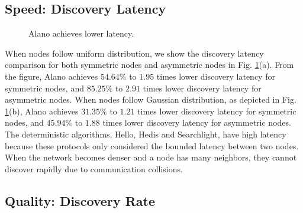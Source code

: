 \subsection{Speed: Discovery Latency}

\begin{figure}[!h]
\centering
{}
\hspace{0.01in}
\caption{Alano achieves lower latency.}
\label{fig_latency}
\end{figure}

When nodes follow uniform distribution, we show the discovery latency comparison for both symmetric nodes and asymmetric nodes in Fig. \ref{fig_latency}(a).
From the figure, Alano achieves $54.64\%$ to $1.95$ times lower discovery latency for symmetric nodes, and $85.25\%$ to $2.91$ times lower discovery latency for asymmetric nodes.
When nodes follow Gaussian distribution, as depicted in Fig. \ref{fig_latency}(b), 
Alano achieves $31.35\%$ to $1.21$ times lower discovery latency for symmetric nodes, and $45.94\%$ to $1.88$ times lower discovery latency for asymmetric nodes.
The deterministic algorithms, Hello, Hedis and Searchlight, have high latency because these protocols only considered the bounded latency between two nodes. When the network becomes denser and a node has many neighbors, they cannot discover rapidly due to communication collisions.


\subsection{Quality: Discovery Rate}




